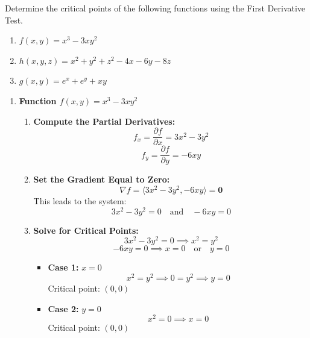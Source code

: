 \exampleline
\begin{example} Determine the critical points of the following functions using the First Derivative Test.
    
    \begin{enumerate}
        \item \( f(x,y) = x^3 - 3xy^2 \)
        \item \( h(x,y,z) = x^2 + y^2 + z^2 - 4x - 6y - 8z \)
        \item \( g(x,y) = e^{x} + e^{y} + xy \)
    \end{enumerate}
    
    \begin{solution}
    \begin{enumerate}
        \item \textbf{Function \( f(x,y) = x^3 - 3xy^2 \)}
        
        \begin{enumerate}
            \item \textbf{Compute the Partial Derivatives:}
            \[
            f_x = \frac{\partial f}{\partial x} = 3x^2 - 3y^2
            \]
            \[
            f_y = \frac{\partial f}{\partial y} = -6xy
            \]
            
            \item \textbf{Set the Gradient Equal to Zero:}
            \[
            \nabla f = \langle 3x^2 - 3y^2, -6xy \rangle = \mathbf{0}
            \]
            This leads to the system:
            \[
            3x^2 - 3y^2 = 0 \quad \text{and} \quad -6xy = 0
            \]
            
            \item \textbf{Solve for Critical Points:}
            \[
            3x^2 - 3y^2 = 0 \implies x^2 = y^2
            \]
            \[
            -6xy = 0 \implies x = 0 \quad \text{or} \quad y = 0
            \]
            
            \begin{itemize}
                \item \textbf{Case 1:} \( x = 0 \)
                \[
                x^2 = y^2 \implies 0 = y^2 \implies y = 0
                \]
                Critical point: \( (0, 0) \)
                
                \item \textbf{Case 2:} \( y = 0 \)
                \[
                x^2 = 0 \implies x = 0
                \]
                Critical point: \( (0, 0) \)
            \end{itemize}
            

\end{enumerate}
\end{enumerate}
\end{solution}
\end{example}
